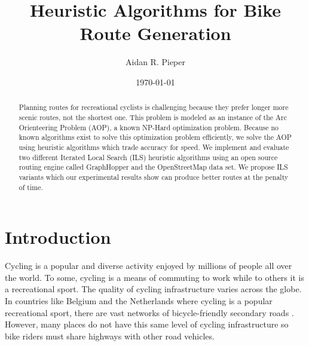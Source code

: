 \documentclass[honors]{union-cs-thesis}
\begin{document}

\title{Heuristic Algorithms for Bike Route Generation}
\author{Aidan R. Pieper}
\date{\today}


\maketitle

\begin{abstract}
\makeabstract

Planning routes for recreational cyclists is challenging because they prefer longer more scenic routes, not the shortest one. This problem is modeled as an instance of the Arc Orienteering Problem (AOP), a known NP-Hard optimization problem. Because no known algorithms exist to solve this optimization problem efficiently, we solve the AOP using  heuristic algorithms which trade accuracy for speed. We implement and evaluate two different Iterated Local Search (ILS) heuristic algorithms using an open source routing engine called GraphHopper and the OpenStreetMap data set. We propose ILS variants which our experimental results show can produce better routes at the penalty of time. 

\end{abstract}

\tableofcontents
\listoffigures %
\listoftables %
\makepreamble


\section{Introduction}
Cycling is a popular and diverse activity enjoyed by millions of people all over the world. To some, cycling is a means of commuting to work while to others it is a recreational sport.  The quality of cycling infrastructure varies across the globe. In countries like Belgium and the Netherlands where cycling is a popular recreational sport, there are vast networks of bicycle-friendly secondary roads \cite{souffriau2011planning}. However, many places do not have this same level of cycling infrastructure so bike riders must share highways with other road vehicles.
\end{document}
